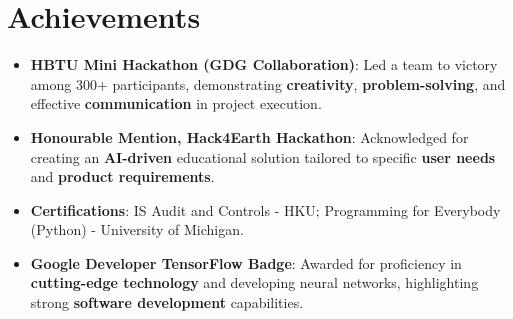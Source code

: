 \documentclass[letterpaper,11pt]{article}
\newcommand{\resumeItem}[2]{
  \item\small{
    \textbf{#1}{: #2 \vspace{-2pt}}
  }
}
\newcommand{\resumeSubHeadingListStart}{\begin{itemize}[leftmargin=*]}
\newcommand{\resumeSubHeadingListEnd}{\end{itemize}}
\begin{document}
\section{Achievements}
 \resumeSubHeadingListStart
    \resumeItem{HBTU Mini Hackathon (GDG Collaboration)}{Led a team to victory among 300+ participants, demonstrating \textbf{creativity}, \textbf{problem-solving}, and effective \textbf{communication} in project execution.}
    \resumeItem{Honourable Mention, Hack4Earth Hackathon}{Acknowledged for creating an \textbf{AI-driven} educational solution tailored to specific \textbf{user needs} and \textbf{product requirements}.}
    \resumeItem{Certifications}{IS Audit and Controls - HKU; Programming for Everybody (Python) - University of Michigan.}
    \resumeItem{Google Developer TensorFlow Badge}{Awarded for proficiency in \textbf{cutting-edge technology} and developing neural networks, highlighting strong \textbf{software development} capabilities.}
 \resumeSubHeadingListEnd
\end{document}
